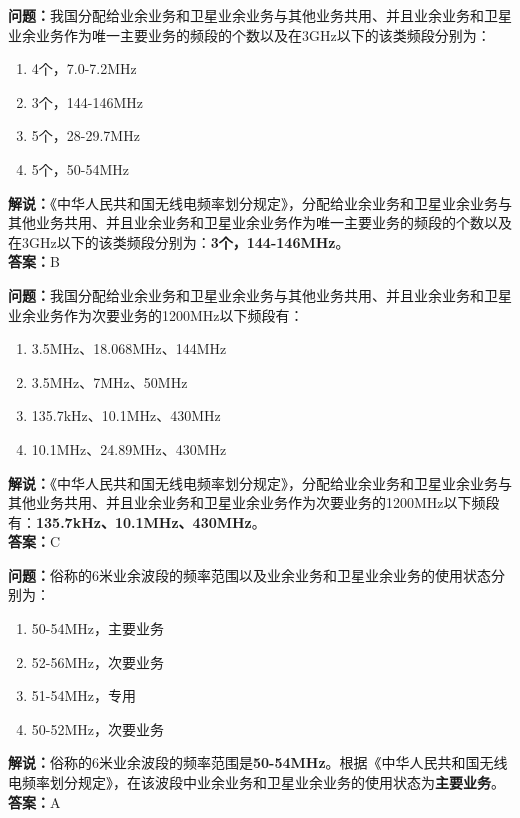 \bigskip


\noindent\textbf{问题：}我国分配给业余业务和卫星业余业务与其他业务共用、并且业余业务和卫星业余业务作为唯一主要业务的频段的个数以及在3GHz以下的该类频段分别为：
\begin{enumerate}[label=\Alph*), leftmargin=3em]
  \item 4个，7.0-7.2MHz
  \item 3个，144-146MHz
  \item 5个，28-29.7MHz
  \item 5个，50-54MHz
\end{enumerate}
\noindent\textbf{解说：}《中华人民共和国无线电频率划分规定》，分配给业余业务和卫星业余业务与其他业务共用、并且业余业务和卫星业余业务作为唯一主要业务的频段的个数以及在3GHz以下的该类频段分别为：\textbf{3个，144-146MHz}。\\\noindent\textbf{答案：}B


\bigskip


\noindent\textbf{问题：}我国分配给业余业务和卫星业余业务与其他业务共用、并且业余业务和卫星业余业务作为次要业务的1200MHz以下频段有：
\begin{enumerate}[label=\Alph*), leftmargin=3em]
  \item 3.5MHz、18.068MHz、144MHz
  \item 3.5MHz、7MHz、50MHz
  \item 135.7kHz、10.1MHz、430MHz
  \item 10.1MHz、24.89MHz、430MHz
\end{enumerate}
\noindent\textbf{解说：}《中华人民共和国无线电频率划分规定》，分配给业余业务和卫星业余业务与其他业务共用、并且业余业务和卫星业余业务作为次要业务的1200MHz以下频段有：\textbf{135.7kHz、10.1MHz、430MHz}。\\\noindent\textbf{答案：}C




\bigskip


\noindent\textbf{问题：}俗称的6米业余波段的频率范围以及业余业务和卫星业余业务的使用状态分别为：
\begin{enumerate}[label=\Alph*), leftmargin=3em]
  \item 50-54MHz，主要业务
  \item 52-56MHz，次要业务
  \item 51-54MHz，专用
  \item 50-52MHz，次要业务
\end{enumerate}
\noindent\textbf{解说：}俗称的6米业余波段的频率范围是\textbf{50-54MHz}。根据《中华人民共和国无线电频率划分规定》，在该波段中业余业务和卫星业余业务的使用状态为\textbf{主要业务}。\\\noindent\textbf{答案：}A


